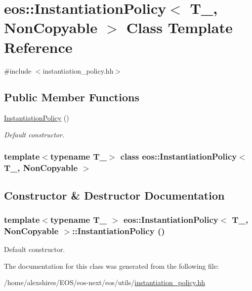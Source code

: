 \hypertarget{classeos_1_1InstantiationPolicy_3_01T___00_01NonCopyable_01_4}{
\section{eos::InstantiationPolicy$<$ T\_\-, NonCopyable $>$ Class Template Reference}
\label{classeos_1_1InstantiationPolicy_3_01T___00_01NonCopyable_01_4}
}


{\ttfamily \#include $<$instantiation\_\-policy.hh$>$}\subsection*{Public Member Functions}
\begin{DoxyCompactItemize}
\item 
\hyperlink{classeos_1_1InstantiationPolicy_3_01T___00_01NonCopyable_01_4_a49c9277b4931f45e51aacee340e30f53}{InstantiationPolicy} ()
\begin{DoxyCompactList}\small\item\em Default constructor. \item\end{DoxyCompactList}\end{DoxyCompactItemize}
\subsubsection*{template$<$typename T\_\-$>$ class eos::InstantiationPolicy$<$ T\_\-, NonCopyable $>$}



\subsection{Constructor \& Destructor Documentation}
\hypertarget{classeos_1_1InstantiationPolicy_3_01T___00_01NonCopyable_01_4_a49c9277b4931f45e51aacee340e30f53}{
\subsubsection[{InstantiationPolicy}]{\setlength{\rightskip}{0pt plus 5cm}template$<$typename T\_\- $>$ eos::InstantiationPolicy$<$ T\_\-, NonCopyable $>$::InstantiationPolicy ()}}
\label{classeos_1_1InstantiationPolicy_3_01T___00_01NonCopyable_01_4_a49c9277b4931f45e51aacee340e30f53}


Default constructor. 

The documentation for this class was generated from the following file:\begin{DoxyCompactItemize}
\item 
/home/alexshires/EOS/eos-\/next/eos/utils/\hyperlink{instantiation__policy_8hh}{instantiation\_\-policy.hh}\end{DoxyCompactItemize}
